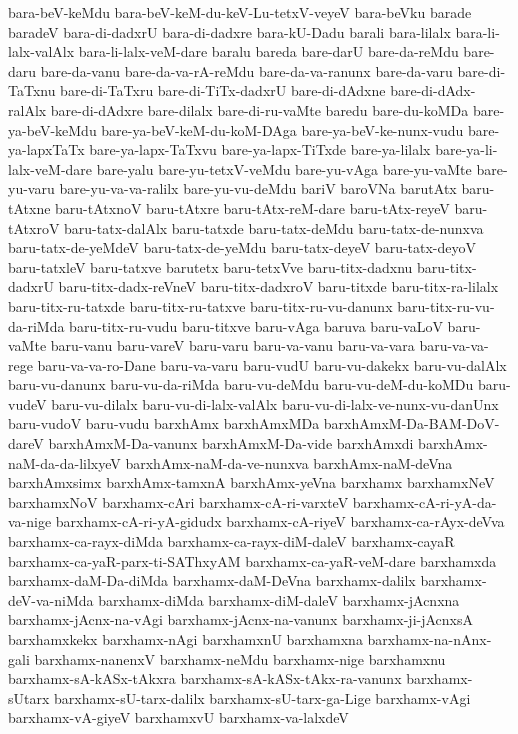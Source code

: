 {bara-beV-keMdu
bara-beV-keM-du-keV-Lu-tetxV-veyeV
bara-beVku
barade
baradeV
bara-di-dadxrU
bara-di-dadxre
bara-kU-Dadu
barali
bara-lilalx
bara-li-lalx-valAlx
bara-li-lalx-veM-dare
baralu
bareda
bare-darU
bare-da-reMdu
bare-daru
bare-da-vanu
bare-da-va-rA-reMdu
bare-da-va-ranunx
bare-da-varu
bare-di-TaTxnu
bare-di-TaTxru
bare-di-TiTx-dadxrU
bare-di-dAdxne
bare-di-dAdx-ralAlx
bare-di-dAdxre
bare-dilalx
bare-di-ru-vaMte
baredu
bare-du-koMDa
bare-ya-beV-keMdu
bare-ya-beV-keM-du-koM-DAga
bare-ya-beV-ke-nunx-vudu
bare-ya-lapxTaTx
bare-ya-lapx-TaTxvu
bare-ya-lapx-TiTxde
bare-ya-lilalx
bare-ya-li-lalx-veM-dare
bare-yalu
bare-yu-tetxV-veMdu
bare-yu-vAga
bare-yu-vaMte
bare-yu-varu
bare-yu-va-va-ralilx
bare-yu-vu-deMdu
bariV
baroVNa
barutAtx
baru-tAtxne
baru-tAtxnoV
baru-tAtxre
baru-tAtx-reM-dare
baru-tAtx-reyeV
baru-tAtxroV
baru-tatx-dalAlx
baru-tatxde
baru-tatx-deMdu
baru-tatx-de-nunxva
baru-tatx-de-yeMdeV
baru-tatx-de-yeMdu
baru-tatx-deyeV
baru-tatx-deyoV
baru-tatxleV
baru-tatxve
barutetx
baru-tetxVve
baru-titx-dadxnu
baru-titx-dadxrU
baru-titx-dadx-reVneV
baru-titx-dadxroV
baru-titxde
baru-titx-ra-lilalx
baru-titx-ru-tatxde
baru-titx-ru-tatxve
baru-titx-ru-vu-danunx
baru-titx-ru-vu-da-riMda
baru-titx-ru-vudu
baru-titxve
baru-vAga
baruva
baru-vaLoV
baru-vaMte
baru-vanu
baru-vareV
baru-varu
baru-va-vanu
baru-va-vara
baru-va-va-rege
baru-va-va-ro-Dane
baru-va-varu
baru-vudU
baru-vu-dakekx
baru-vu-dalAlx
baru-vu-danunx
baru-vu-da-riMda
baru-vu-deMdu
baru-vu-deM-du-koMDu
baru-vudeV
baru-vu-dilalx
baru-vu-di-lalx-valAlx
baru-vu-di-lalx-ve-nunx-vu-danUnx
baru-vudoV
baru-vudu
barxhAmx
barxhAmxMDa
barxhAmxM-Da-BAM-DoV-dareV
barxhAmxM-Da-vanunx
barxhAmxM-Da-vide
barxhAmxdi
barxhAmx-naM-da-da-lilxyeV
barxhAmx-naM-da-ve-nunxva
barxhAmx-naM-deVna
barxhAmxsimx
barxhAmx-tamxnA
barxhAmx-yeVna
barxhamx
barxhamxNeV
barxhamxNoV
barxhamx-cAri
barxhamx-cA-ri-varxteV
barxhamx-cA-ri-yA-da-va-nige
barxhamx-cA-ri-yA-gidudx
barxhamx-cA-riyeV
barxhamx-ca-rAyx-deVva
barxhamx-ca-rayx-diMda
barxhamx-ca-rayx-diM-daleV
barxhamx-cayaR
barxhamx-ca-yaR-parx-ti-SAThxyAM
barxhamx-ca-yaR-veM-dare
barxhamxda
barxhamx-daM-Da-diMda
barxhamx-daM-DeVna
barxhamx-dalilx
barxhamx-deV-va-niMda
barxhamx-diMda
barxhamx-diM-daleV
barxhamx-jAcnxna
barxhamx-jAcnx-na-vAgi
barxhamx-jAcnx-na-vanunx
barxhamx-ji-jAcnxsA
barxhamxkekx
barxhamx-nAgi
barxhamxnU
barxhamxna
barxhamx-na-nAnx-gali
barxhamx-nanenxV
barxhamx-neMdu
barxhamx-nige
barxhamxnu
barxhamx-sA-kASx-tAkxra
barxhamx-sA-kASx-tAkx-ra-vanunx
barxhamx-sUtarx
barxhamx-sU-tarx-dalilx
barxhamx-sU-tarx-ga-Lige
barxhamx-vAgi
barxhamx-vA-giyeV
barxhamxvU
barxhamx-va-lalxdeV
}
